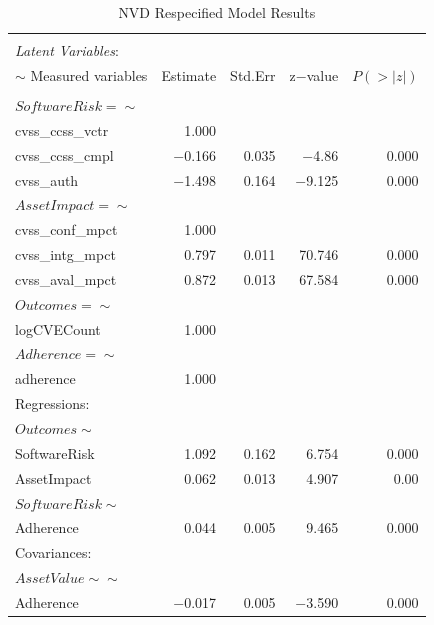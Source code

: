 \begin{table}
	\begin{center}	
		\caption{NVD Respecified Model Results}
		\label{tab:results_nvd}
		\begin{tabular}{l|rrrr}
				\\[-1.8ex]\hline 
				\hline \\[-1.8ex] 
			\textit{Latent Variables}:  & & & & \\  
			$\sim$ Measured variables& Estimate & Std.Err & z$-$value & $P(>|z|)$ \\
				\hline \\[-1.8ex]
			$SoftwareRisk =\sim$  & & & & \\                                   
			cvss\_ccss\_vctr   & 1.000 & &  & \\                             
			cvss\_ccss\_cmpl &  $-$0.166 &   0.035 &  $-$4.86 &   0.000\\
			cvss\_auth     &   $-$1.498  &  0.164  & $-$9.125   & 0.000\\
			$AssetImpact =\sim$     & & & & \\                                    
			cvss\_conf\_mpct   & 1.000     & & & \\                       
			cvss\_intg\_mpct   & 0.797   & 0.011 & 70.746 &   0.000 \\
			cvss\_aval\_mpct  &  0.872   & 0.013 & 67.584   & 0.000 \\
			$Outcomes =\sim$    & & & & \\                                     
			logCVECount     &  1.000  & & & \\                          
			$Adherence =\sim$   & & & & \\                                      
			adherence    &     1.000        & & & \\                    
			Regressions:  & & & & \\  
			$Outcomes \sim$         & & & & \\                                     
			SoftwareRisk   &  1.092 &   0.162 & 6.754 &   0.000 \\
			AssetImpact     &   0.062  &  0.013  &  4.907 &   0.00\\
			$SoftwareRisk \sim$        & & & & \\                                  
			Adherence     &    0.044 &   0.005  &  9.465 &   0.000\\
			Covariances:  & & & & \\  
			$AssetValue \sim\sim$          & & & & \\                                 
			Adherence      &  $-$0.017  &  0.005 &  $-$3.590 &   0.000\\
		\end{tabular}
	\end{center}
\end{table}

